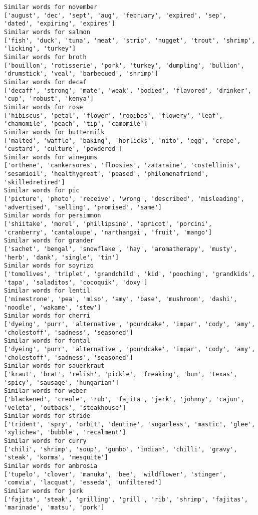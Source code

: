 \documentclass[11pt]{article}
\begin{document}
\begin{Verbatim}[commandchars=\\\{\}]
Similar words for november
['august', 'dec', 'sept', 'aug', 'february', 'expired', 'sep', 'dated', 'expiring', 'expires']
Similar words for salmon
['fish', 'duck', 'tuna', 'meat', 'strip', 'nugget', 'trout', 'shrimp', 'licking', 'turkey']
Similar words for broth
['bouillon', 'rotisserie', 'pork', 'turkey', 'dumpling', 'bullion', 'drumstick', 'veal', 'barbecued', 'shrimp']
Similar words for decaf
['decaff', 'strong', 'mate', 'weak', 'bodied', 'flavored', 'drinker', 'cup', 'robust', 'kenya']
Similar words for rose
['hibiscus', 'petal', 'flower', 'rooibos', 'flowery', 'leaf', 'chamomile', 'peach', 'tip', 'camomile']
Similar words for buttermilk
['malted', 'waffle', 'baking', 'horlicks', 'nito', 'egg', 'crepe', 'custard', 'culture', 'powdered']
Similar words for winegums
['orthene', 'cankersores', 'floosies', 'zataraine', 'costellinis', 'sesamioil', 'healthygreat', 'peased', 'philomenafriend', 'skilledretired']
Similar words for pic
['picture', 'photo', 'receive', 'wrong', 'described', 'misleading', 'advertised', 'selling', 'promised', 'same']
Similar words for persimmon
['shiitake', 'morel', 'phillipsine', 'apricot', 'porcini', 'cranberry', 'cantaloupe', 'narthangai', 'fruit', 'mango']
Similar words for grander
['sachet', 'bengal', 'snowflake', 'hay', 'aromatherapy', 'musty', 'herb', 'dank', 'single', 'tin']
Similar words for soyrizo
['tomolives', 'triplet', 'grandchild', 'kid', 'pooching', 'grandkids', 'tapa', 'saladitos', 'cocoquik', 'doxy']
Similar words for lentil
['minestrone', 'pea', 'miso', 'amy', 'base', 'mushroom', 'dashi', 'noodle', 'wakame', 'stew']
Similar words for cherri
['dyeing', 'purr', 'alternative', 'poundcake', 'impar', 'cody', 'amy', 'cholestoff', 'sadness', 'seasoned']
Similar words for fontal
['dyeing', 'purr', 'alternative', 'poundcake', 'impar', 'cody', 'amy', 'cholestoff', 'sadness', 'seasoned']
Similar words for sauerkraut
['kraut', 'brat', 'relish', 'pickle', 'freaking', 'bun', 'texas', 'spicy', 'sausage', 'hungarian']
Similar words for weber
['blackened', 'creole', 'rub', 'fajita', 'jerk', 'johnny', 'cajun', 'veleta', 'outback', 'steakhouse']
Similar words for stride
['trident', 'spry', 'orbit', 'dentine', 'sugarless', 'mastic', 'glee', 'xylichew', 'bubble', 'recalment']
Similar words for curry
['chili', 'shrimp', 'soup', 'gumbo', 'indian', 'chilli', 'gravy', 'steak', 'korma', 'mesquite']
Similar words for ambrosia
['tupelo', 'clover', 'manuka', 'bee', 'wildflower', 'stinger', 'comvia', 'lacquat', 'esseda', 'unfiltered']
Similar words for jerk
['fajita', 'steak', 'grilling', 'grill', 'rib', 'shrimp', 'fajitas', 'marinade', 'matsu', 'pork']

\end{Verbatim}
\end{document}

